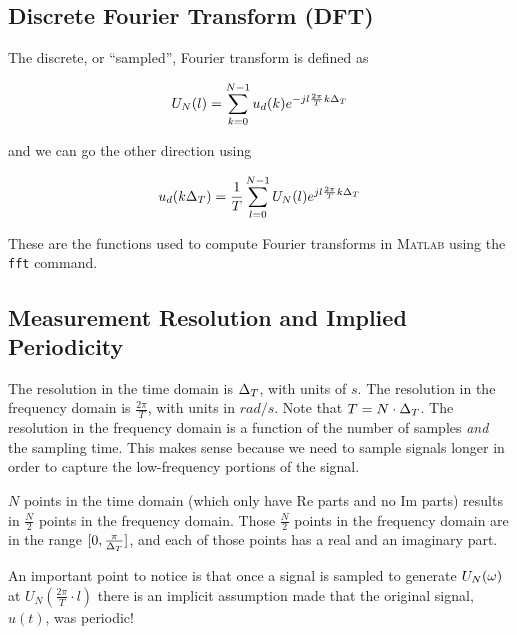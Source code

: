 \subsection{Discrete Fourier Transform (DFT)}
The discrete, or ``sampled'', Fourier transform is defined as

\begin{equation*}
U_N(l) = \sum_{k=0}^{N-1} u_d(k) e^{-jl\frac{2\pi}{T}k\Delta_T}
\end{equation*}

and we can go the other direction using

\begin{equation*}
u_d(k\Delta_T) = \frac{1}{T} \sum_{l=0}^{N-1} U_N(l) e^{jl\frac{2\pi}{T}k\Delta_T}
\end{equation*}

These are the functions used to compute Fourier transforms in \textsc{Matlab} using the \texttt{fft} command.

\subsection{Measurement Resolution and Implied Periodicity}%
\label{sec:impliedperiodicity}
The resolution in the time domain is $\Delta_T$, with units of $s$.
The resolution in the frequency domain is $\frac{2\pi}{T}$, with units in $rad/s$.
Note that $T=N\cdot\Delta_T$.
The resolution in the frequency domain is a function of the number of samples \textit{and} the sampling time.
This makes sense because  we need to sample signals longer in order to capture the low-frequency portions of the signal.

$N$ points in the time domain (which only have $\text{Re}$ parts and no $\text{Im}$ parts) results in $\frac{N}{2}$ points in the frequency domain.
Those $\frac{N}{2}$ points in the frequency domain are in the range $[0,\frac{\pi}{\Delta_T}]$, and each of those points has a real and an imaginary part.

An important point to notice is that once a signal is sampled to generate $U_N(\omega)$ at $U_N(\frac{2\pi}{T}\cdot l)$ there is an implicit assumption made that the original signal, $u(t)$, was periodic!
